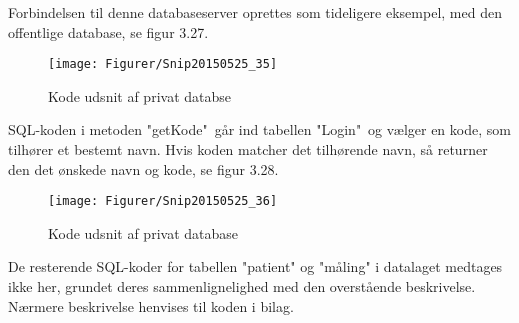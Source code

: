 Forbindelsen til denne databaseserver oprettes som tideligere eksempel, med den offentlige database, se figur 3.27.  

\begin{figure}[H]
	\centering
	\texttt{[image: Figurer/Snip20150525\_35]}
	\caption{Kode udsnit af privat databse}	
\end{figure}

SQL-koden i metoden "getKode"\  går ind tabellen "Login"\  og vælger en kode, som tilhører et bestemt navn. Hvis koden matcher det tilhørende navn, så returner den det ønskede navn og kode, se figur 3.28.   

\begin{figure}[H]
	\centering
	\texttt{[image: Figurer/Snip20150525\_36]}
	\caption{Kode udsnit af privat database}
\end{figure}

De resterende SQL-koder for tabellen "patient" og "måling" i datalaget medtages ikke her, grundet deres sammenlignelighed med den overstående beskrivelse. Nærmere beskrivelse henvises til koden i bilag.









